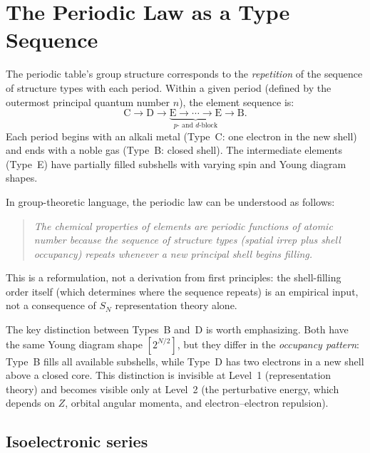 \documentclass[aps,prl,twocolumn,superscriptaddress,longbibliography]{revtex4-2}
\begin{document}

\section{The Periodic Law as a Type Sequence}
\label{sec:periodic_law}

The periodic table's group structure corresponds to the
\emph{repetition} of the sequence of structure types with each
period.  Within a given
period (defined by the outermost principal quantum number $n$), the
element sequence is:
\begin{equation}
  \mathrm{C} \to \mathrm{D} \to \underbrace{\mathrm{E} \to \cdots \to
  \mathrm{E}}_{p\text{- and }d\text{-block}} \to \mathrm{B}.
  \label{eq:period_sequence}
\end{equation}
Each period begins with an alkali metal (Type~C: one electron in the
new shell) and ends with a noble gas (Type~B: closed shell).  The
intermediate elements (Type~E) have partially filled subshells with
varying spin and Young diagram shapes.

In group-theoretic language, the periodic law can be understood as
follows:
\begin{quote}
\emph{The chemical properties of elements are periodic functions of
atomic number because the sequence of structure types (spatial irrep
plus shell occupancy) repeats whenever a new principal shell begins
filling.}
\end{quote}
This is a reformulation, not a derivation from first principles: the
shell-filling order itself (which determines where the sequence
repeats) is an empirical input, not a consequence of $S_N$
representation theory alone.

The key distinction between Types~B and~D is worth emphasizing.
Both have the same Young diagram shape $[2^{N/2}]$, but they differ
in the \emph{occupancy pattern}: Type~B fills all available subshells,
while Type~D has two electrons in a new shell above a closed core.
This distinction is invisible at Level~1 (representation theory) and
becomes visible only at Level~2 (the perturbative energy, which
depends on $Z$, orbital angular momenta, and electron--electron
repulsion).

\subsection{Isoelectronic series}
\label{sec:isoelectronic}
\end{document}
